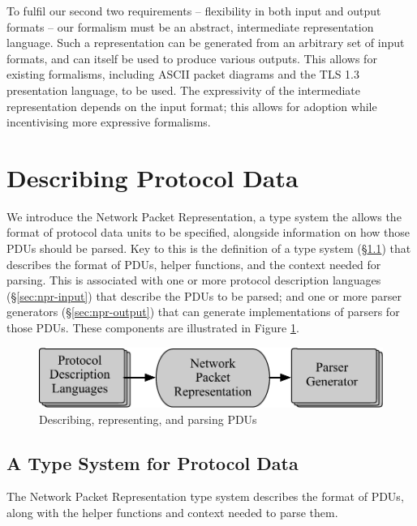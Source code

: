 \documentclass[10pt,sigconf]{acmart}
\begin{document}
To fulfil our second two requirements -- flexibility in both input and output formats --
our formalism must be an abstract, intermediate representation language. Such a
representation can be generated from an arbitrary set of input formats, and can itself be
used to produce various outputs. This allows for existing formalisms, including ASCII
packet diagrams and the TLS 1.3 presentation language, to be used. The expressivity
of the intermediate representation depends on the input format; this allows for adoption
while incentivising more expressive formalisms.

\section{Describing Protocol Data}
\label{sec:npr}

We introduce the Network Packet Representation, a type system the allows
the format of protocol data units to be specified, alongside information
on how those PDUs should be parsed.
Key to this is the definition of a type system (\S\ref{sec:npr-types}) that
describes the format of PDUs, helper functions, and the context needed for
parsing.
This is associated with one or more protocol description languages
(\S\ref{sec:npr-input}) that describe the PDUs to be parsed; and one
or more parser generators (\S\ref{sec:npr-output}) that can generate
implementations of parsers for those PDUs.
These components are illustrated in Figure \ref{fig:stages}.

\begin{figure}
  \includegraphics[width=\linewidth]{figures/architecture-flow.pdf}
  \caption{Describing, representing, and parsing PDUs}
  \label{fig:stages}
\end{figure}

\subsection{A Type System for Protocol Data}
\label{sec:npr-types}

The Network Packet Representation type system describes the format of PDUs,
along with the helper functions and context needed to parse them.
\end{document}
